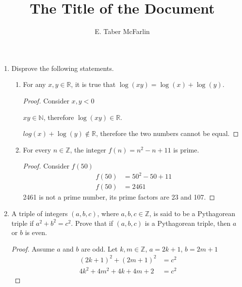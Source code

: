 \documentclass[12pt,a4paper,reqno,parskip=full]{amsart}
\numberwithin{equation}{section}
\theoremstyle{plain}
\theoremstyle{definition}
\begin{document}
\title{The Title of the Document}

\author{E. Taber McFarlin}

\maketitle

\begin{enumerate}
  \item Disprove the following statements.
        \begin{enumerate}
          \item For any $x,y\in\mathbb{R}$, it is true that $\log(xy)=\log(x)+\log(y)$.
                \begin{proof} Consider $x,y<0$

                  $xy\in\mathbb{N}$, therefore $\log(xy)\in\mathbb{R}$.

                  $log(x) + \log(y)\notin\mathbb{R}$, therefore the two numbers cannot be equal.
                \end{proof}

          \item For every $n\in\mathbb{Z}$, the integer $f(n)=n^2-n+11$ is prime.
                \begin{proof} Consider $f(50)$
                  \begin{align*}
                    f(50) & = 50^2 - 50 + 11 \\
                    f(50) & = 2461
                  \end{align*}
                  2461 is not a prime number, its prime factors are 23 and 107.
                \end{proof}
        \end{enumerate}

  \item A triple of integers $(a,b,c)$, where $a,b,c\in\mathbb{Z}$, is said to be a Pythagorean triple if $a^2+b^2=c^2$. Prove that if $(a,b,c)$ is a Pythagorean triple, then $a$ or $b$ is even.
        \begin{proof}
          Assume $a$ and $b$ are odd. Let $k,m\in\mathbb{Z}$, $a = 2k + 1$, $b = 2m + 1$
          \begin{align*}
            (2k + 1)^2 + (2m + 1)^2   & = c^2 \\
            4k^2 + 4m^2 + 4k + 4m + 2 & = c^2
          \end{align*}
        \end{proof}


\end{enumerate}
\end{document}
